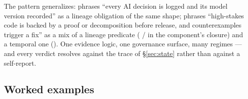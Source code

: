 \noindent
The pattern generalizes:  phrases ``every AI decision is logged and its model version
recorded'' as a lineage obligation of the same shape;  phrases ``high-stakes code
is backed by a proof or decomposition before release, and counterexamples trigger a fix'' as a mix of a lineage
predicate ( /  in the component's closure) and a temporal one
(). One evidence logic, one governance surface, many regimes --- and every verdict
resolves against the trace of \S\ref{sec:state} rather than against a self-report.

\subsection{Worked examples}\label{sec:pol-worked}

